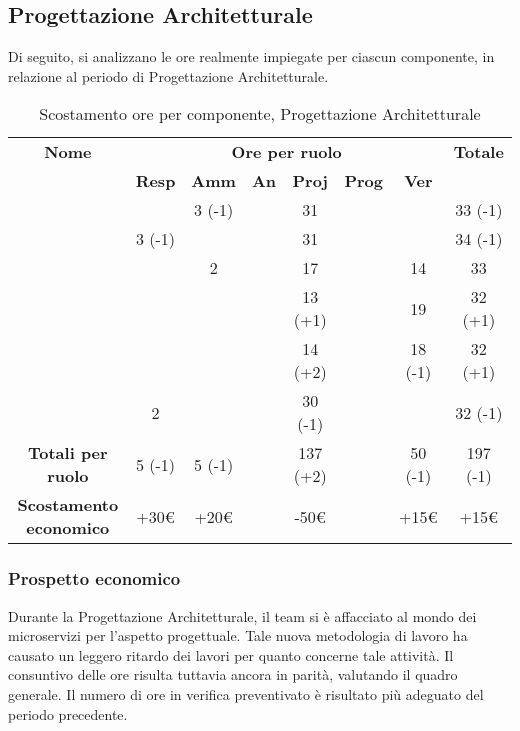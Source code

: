 \newpage
\subsection{Progettazione Architetturale}

Di seguito, si analizzano le ore realmente impiegate per ciascun componente, in relazione al periodo di Progettazione Architetturale.

\begin{table}[H]
	\begin{center}
		\begin{tabular}{|c|c|c|c|c|c|c|c|}
			\hline
			\textbf{Nome} & \multicolumn{6}{c|}{\textbf{Ore per ruolo}} & \textbf{Totale} \\\cline{2-7}
			& \textbf{Resp} & \textbf{Amm} & \textbf{An} & \textbf{Proj} & \textbf{Prog} & \textbf{Ver} & \\
			\hline
			\MC			&		&	3 (-1)	&		&	31		&		&		&   33	(-1)\\
			\hline
			\AN			&3 (-1)	&			&		&	31		&		&		& 	34 (-1)	\\
			\hline
			\DAN		&		&	2		&		&	17		&		&	14	&	33	\\
			\hline
			\AS			&		&		 	&	 	&	13 (+1)	&	 	& 	19	&	32 (+1)	\\
			\hline
			\NS 		&		&			&		&	14 (+2)	&		& 	18 (-1)	&	32 (+1)	\\
			\hline
			\DS			& 	2	&			&		&	30 (-1)	&		&		&	32 (-1)	\\
			\hline
			\textbf{Totali per ruolo}	& 	5 (-1)	&	5 (-1)	&		&	137 (+2)	&		&	50 (-1)	&	197 (-1)	\\
			\hline
			\textbf{Scostamento economico}	& 	+30€	&	+20€	&		&	-50€	&		&	+15€	&	+15€	\\
			\hline
		\end{tabular}
	\end{center}
	\caption{Scostamento ore per componente, Progettazione Architetturale}
\end{table}

\subsubsection{Prospetto economico}
Durante la Progettazione Architetturale, il team si è affacciato al mondo dei microservizi per l'aspetto progettuale. Tale nuova metodologia di lavoro ha causato un leggero ritardo dei lavori per quanto concerne tale attività. Il consuntivo delle ore risulta tuttavia ancora in parità, valutando il quadro generale. Il numero di ore in verifica preventivato è risultato più adeguato del periodo precedente.

